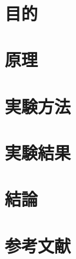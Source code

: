 \documentclass[a4paper, 11pt, openany, twocolumn]{ltjsarticle} %
\title{\protect \Large \bf}
\author{\bf \\ \bf}
\date{}
\begin{document}
\maketitle
\thispagestyle{empty}

\section{目的}


\section{原理}

\section{実験方法}

\section{実験結果}

\section{結論}

\section*{参考文献}
\end{document}
